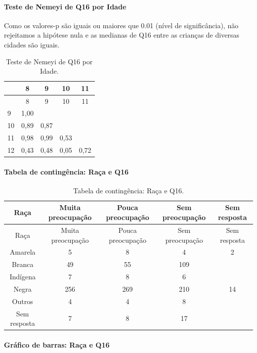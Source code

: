 \documentclass[]{article}
\let\oldparagraph\paragraph
\renewcommand{\paragraph}[1]{\oldparagraph{#1}\mbox{}}
\begin{document}
\hypertarget{teste-de-nemeyi-de-q16-por-idade}{%
\paragraph{Teste de Nemeyi de Q16 por Idade}\label{teste-de-nemeyi-de-q16-por-idade}}

Como os valores-p são iguais ou maiores que 0.01 (nível de significância), não rejeitamos a hipótese nula e as medianas de Q16 entre as crianças de diversas cidades são iguais.

\begin{longtable}[]{@{}lcccc@{}}
\caption{\label{tab:unnamed-chunk-159}Teste de Nemeyi de Q16 por Idade.}\tabularnewline
\toprule
& 8 & 9 & 10 & 11\tabularnewline
\midrule
\endfirsthead
\toprule
& 8 & 9 & 10 & 11\tabularnewline
\midrule
\endhead
9 & 1,00 & & &\tabularnewline
10 & 0,89 & 0,87 & &\tabularnewline
11 & 0,98 & 0,99 & 0,53 &\tabularnewline
12 & 0,43 & 0,48 & 0,05 & 0,72\tabularnewline
\bottomrule
\end{longtable}

\cleardoublepage

\hypertarget{tabela-de-continguxeancia-rauxe7a-e-q16}{%
\paragraph{Tabela de contingência: Raça e Q16}\label{tabela-de-continguxeancia-rauxe7a-e-q16}}

\begin{longtable}[]{@{}ccccc@{}}
\caption{\label{tab:unnamed-chunk-160}Tabela de contingência: Raça e Q16.}\tabularnewline
\toprule
Raça & Muita preocupação & Pouca preocupação & Sem preocupação & Sem resposta\tabularnewline
\midrule
\endfirsthead
\toprule
Raça & Muita preocupação & Pouca preocupação & Sem preocupação & Sem resposta\tabularnewline
\midrule
\endhead
Amarela & 5 & 8 & 4 & 2\tabularnewline
Branca & 49 & 55 & 109 &\tabularnewline
Indígena & 7 & 8 & 6 &\tabularnewline
Negra & 256 & 269 & 210 & 14\tabularnewline
Outros & 4 & 4 & 8 &\tabularnewline
Sem resposta & 7 & 8 & 17 &\tabularnewline
\bottomrule
\end{longtable}

\hypertarget{gruxe1fico-de-barras-rauxe7a-e-q16}{%
\paragraph{Gráfico de barras: Raça e Q16}\label{gruxe1fico-de-barras-rauxe7a-e-q16}}
\end{document}
